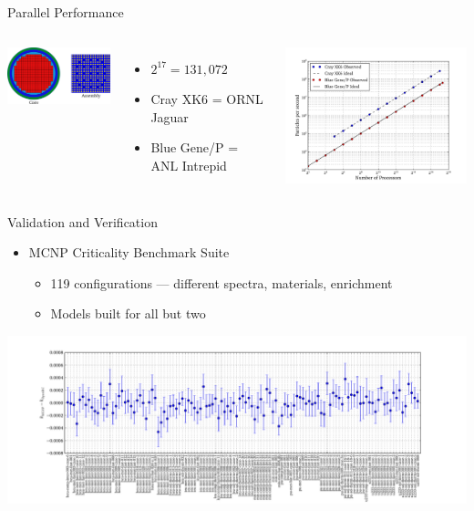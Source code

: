 \documentclass[serif]{beamer}
\begin{document}
\begin{frame}{Parallel Performance}
  \begin{columns}
    \begin{center}
      \includegraphics[width=1.7in]{src/mcperformance.pdf}
    \end{center}
    \footnotesize{
      \begin{itemize}
      \item<1-> $2^{17} = 131,072$
      \item<1-> Cray XK6 = ORNL Jaguar
      \item<1-> Blue Gene/P = ANL Intrepid
      \end{itemize}
    }
    \includegraphics[width=3.0in]{src/scaling_loglog.pdf}
  \end{columns}
\end{frame}


\begin{frame}{Validation and Verification}
  \begin{itemize}
  \item<1-> MCNP Criticality Benchmark Suite
    \begin{itemize}
    \item<1-> 119 configurations --- different spectra, materials, enrichment
    \item<1-> Models built for all but two
    \end{itemize}
  \end{itemize}
  \centerline{
    \includegraphics[width=1.35\textwidth]{src/expanded-suite.pdf}
  }
\end{frame}
\end{document}
